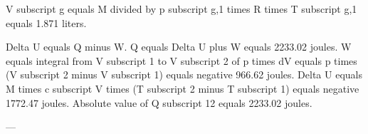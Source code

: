 V subscript g equals M divided by p subscript g,1 times R times T subscript g,1 equals 1.871 liters.  

Delta U equals Q minus W.  
Q equals Delta U plus W equals 2233.02 joules.  
W equals integral from V subscript 1 to V subscript 2 of p times dV equals p times (V subscript 2 minus V subscript 1) equals negative 966.62 joules.  
Delta U equals M times c subscript V times (T subscript 2 minus T subscript 1) equals negative 1772.47 joules.  
Absolute value of Q subscript 12 equals 2233.02 joules.  

---